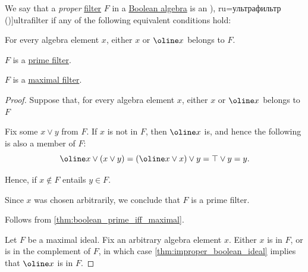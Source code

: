 \begin{definition}\label{def:ultrafilter}
  We say that a \emph{proper} \hyperref[def:lattice_ideal]{filter} \( F \) in a \hyperref[def:boolean_algebra]{Boolean algebra} is an \term[bg=ултрафилтер (\cite[18]{Проданов1982ФункционаленАнализЧаст1}), ru=ультрафильтр (\cite[182]{Гуров2013ТеорияРешёток})]{ultrafilter} if any of the following equivalent conditions hold:
  \begin{thmenum}
     For every algebra element \( x \), either \( x \) or \( \oline x \) belongs to \( F \).

     \( F \) is a \hyperref[def:lattice_ideal/prime]{prime filter}.

     \( F \) is a \hyperref[def:lattice_ideal/maximal]{maximal filter}.
  \end{thmenum}
\end{definition}
\begin{proof}
   Suppose that, for every algebra element \( x \), either \( x \) or \( \oline x \) belongs to \( F \)

  Fix some \( x \vee y \) from \( F \). If \( x \) is not in \( F \), then \( \oline x \) is, and hence the following is also a member of \( F \):
  \begin{equation*}
    \oline x \vee (x \vee y)
    =
    (\oline x \vee x) \vee y
    =
    \top \vee y
    =
    y.
  \end{equation*}

  Hence, if \( x \notin F \) entails \( y \in F \).

  Since \( x \) was chosen arbitrarily, we conclude that \( F \) is a prime filter.

   Follows from \cref{thm:boolean_prime_iff_maximal}.

   Let \( F \) be a maximal ideal. Fix an arbitrary algebra element \( x \). Either \( x \) is in \( F \), or is in the complement of \( F \), in which case \cref{thm:improper_boolean_ideal} implies that \( \oline x \) is in \( F \).
\end{proof}

